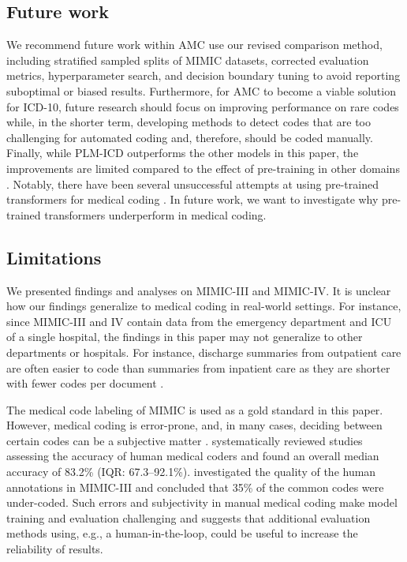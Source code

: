 {\subsection{Future work}
We recommend future work within AMC use our revised comparison method, including stratified sampled splits of MIMIC datasets, corrected evaluation metrics, hyperparameter search, and decision boundary tuning to avoid reporting suboptimal or biased results. 
Furthermore, for AMC to become a viable solution for ICD-10, future research should focus on improving performance on rare codes while, in the shorter term, developing methods to detect codes that are too challenging for automated coding and, therefore, should be coded manually. Finally, while PLM-ICD outperforms the other models in this paper, the improvements are limited compared to the effect of pre-training in other domains \parencite{mohamed_selfsupervised_2022, linPretrainedTransformersText2021,baevski_wav2vec_2020,devlin_bert_2018,dosovitskiy_image_2021}.
Notably, there have been several unsuccessful attempts at using pre-trained transformers for medical coding \parencite{jiDoesMagicBERT2021,gaoLimitationsTransformersClinical2021,michalopoulosICDBigBirdContextualEmbedding2022,pascualBERTbasedAutomaticICD2021,zhangBERTXMLLargeScale2020}. In future work, we want to investigate why pre-trained transformers underperform in medical coding.


\subsection{Limitations}
We presented findings and analyses on MIMIC-III and MIMIC-IV. It is unclear how our findings generalize to medical coding in real-world settings.
For instance, since MIMIC-III and IV contain data from the emergency department and ICU of a single hospital, the findings in this paper may not generalize to other departments or hospitals. 
For instance, discharge summaries from outpatient care are often easier to code than summaries from inpatient care as they are shorter with fewer codes per document \parencite{zhangBERTXMLLargeScale2020, liuEffectiveConvolutionalAttention2021, tsengAdministrativeCostsAssociated2018}.

The medical code labeling of MIMIC is used as a gold standard in this paper. However, medical coding is error-prone, and, in many cases, deciding between certain codes can be a subjective matter \parencite{nouraeiAuditNatureImpact2013, lloydPhysicianCodingErrors1985}. \textcite{burnsSystematicReviewDischarge2012} systematically reviewed studies assessing the accuracy of human medical coders and found an overall median accuracy of 83.2\% (IQR: 67.3–92.1\%). \textcite{searleExperimentalEvaluationDevelopment2020} investigated the quality of the human annotations in MIMIC-III and concluded that 35\% of the common codes were under-coded. Such errors and subjectivity in manual medical coding make model training and evaluation challenging and suggests that additional evaluation methods using, e.g., a human-in-the-loop, could be useful to increase the reliability of results. 

}
